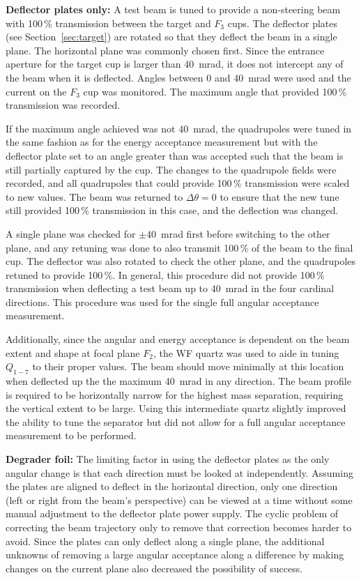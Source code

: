 \textbf{Deflector plates only:}
A test beam is tuned to provide a non-steering beam with 100\,\%
transmission between the target and $F_3$ cups. The deflector plates
(see Section~\ref{sec:target}) are rotated so that they deflect the beam
in a single plane. The horizontal plane was commonly chosen first. Since
the entrance aperture for the target cup is larger than 40~mrad, it does
not intercept any of the beam when it is deflected. Angles between 0 and
40~mrad were used and the current on the $F_3$ cup was monitored. The
maximum angle that provided 100\,\% transmission was recorded.

If the maximum angle achieved was not 40~mrad, the quadrupoles were
tuned in the same fashion as for the energy acceptance measurement but
with the deflector plate set to an angle greater than was accepted such
that the beam is still partially captured by the cup. The changes to the
quadrupole fields were recorded, and all quadrupoles that could provide
100\,\% transmission were scaled to new values. The beam was returned to
$\Delta\theta = 0$ to ensure that the new tune still provided 100\,\%
transmission in this case, and the deflection was changed.

A single plane was checked for $\pm 40$~mrad first before switching to
the other plane, and any retuning was done to also transmit 100\,\% of
the beam to the final cup. The deflector was also rotated to check the
other plane, and the quadrupoles retuned to provide 100\,\%. In general,
this procedure did not provide 100\,\% transmission when deflecting a
test beam up to 40~mrad in the four cardinal directions. This procedure
was used for the single full angular acceptance measurement.

Additionally, since the angular and energy acceptance is dependent on
the beam extent and shape at focal plane $F_2$, the WF quartz was used
to aide in tuning $Q_{1-7}$ to their proper values. The beam should move
minimally at this location when deflected up the the maximum 40~mrad in
any direction. The beam profile is required to be horizontally narrow
for the highest mass separation, requiring the vertical extent to be
large. Using this intermediate quartz slightly improved the ability to
tune the separator but did not allow for a full angular acceptance
measurement to be performed.

\textbf{Degrader foil:}
The limiting factor in using the deflector plates as the only angular
change is that each direction must be looked at independently. Assuming
the plates are aligned to deflect in the horizontal direction, only one
direction (left or right from the beam's perspective) can be viewed at a
time without some manual adjustment to the deflector plate power supply.
The cyclic problem of correcting the beam trajectory only to remove that
correction becomes harder to avoid. Since the plates can only deflect
along a single plane, the additional unknowns of removing a large
angular acceptance along a difference by making changes on the current
plane also decreased the possibility of success.

